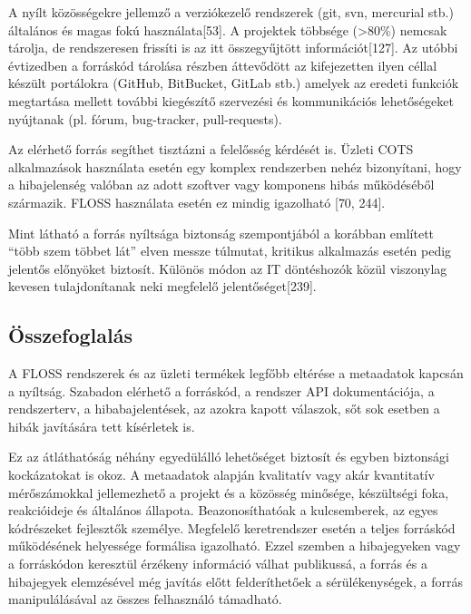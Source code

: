 \documentclass[12pt,magyar,a4paper,oneside]{scrreprt}
\begin{document}
A nyílt közösségekre jellemző a verziókezelő rendszerek (git, svn,
mercurial stb.) általános és magas fokú használata{[}53{]}. A projektek
többsége (\textgreater{}80\%) nemcsak tárolja, de rendszeresen frissíti
is az itt összegyűjtött információt{[}127{]}. Az utóbbi évtizedben a
forráskód tárolása részben áttevődött az kifejezetten ilyen céllal
készült portálokra (GitHub, BitBucket, GitLab stb.) amelyek az eredeti
funkciók megtartása mellett további kiegészítő szervezési és
kommunikációs lehetőségeket nyújtanak (pl. fórum, bug-tracker,
pull-requests).

Az elérhető forrás segíthet tisztázni a felelősség kérdését is. Üzleti
COTS alkalmazások használata esetén egy komplex rendszerben nehéz
bizonyítani, hogy a hibajelenség valóban az adott szoftver vagy
komponens hibás működéséből származik. FLOSS használata esetén ez mindig
igazolható {[}70, 244{]}.

Mint látható a forrás nyíltsága biztonság szempontjából a korábban
említett ``több szem többet lát'' elven messze túlmutat, kritikus
alkalmazás esetén pedig jelentős előnyöket biztosít. Különös módon az IT
döntéshozók közül viszonylag kevesen tulajdonítanak neki megfelelő
jelentőséget{[}239{]}.

\hypertarget{uxf6sszefoglaluxe1s-5}{%
\subsection{Összefoglalás}\label{uxf6sszefoglaluxe1s-5}}

A FLOSS rendszerek és az üzleti termékek legfőbb eltérése a metaadatok
kapcsán a nyíltság. Szabadon elérhető a forráskód, a rendszer API
dokumentációja, a rendszerterv, a hibabajelentések, az azokra kapott
válaszok, sőt sok esetben a hibák javítására tett kísérletek is.

Ez az átláthatóság néhány egyedülálló lehetőséget biztosít és egyben
biztonsági kockázatokat is okoz. A metaadatok alapján kvalitatív vagy
akár kvantitatív mérőszámokkal jellemezhető a projekt és a közösség
minősége, készültségi foka, reakcióideje és általános állapota.
Beazonosíthatóak a kulcsemberek, az egyes kódrészeket fejlesztők
személye. Megfelelő keretrendszer esetén a teljes forráskód működésének
helyessége formálisa igazolható. Ezzel szemben a hibajegyeken vagy a
forráskódon keresztül érzékeny információ válhat publikussá, a forrás és
a hibajegyek elemzésével még javítás előtt felderíthetőek a
sérülékenységek, a forrás manipulálásával az összes felhasználó
támadható.
\end{document}
